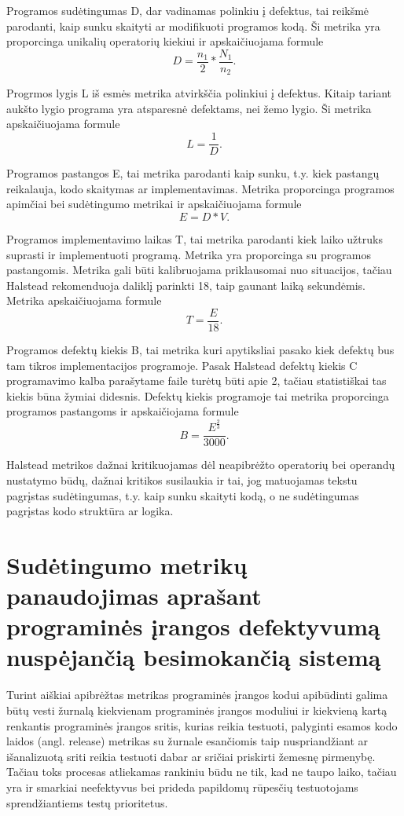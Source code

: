 \documentclass{VUMIFPSbakalaurinis}
\begin{document}
Programos sudėtingumas D, dar vadinamas polinkiu į defektus, tai reikšmė parodanti, kaip sunku skaityti ar modifikuoti programos kodą. Ši metrika yra proporcinga unikalių operatorių kiekiui ir apskaičiuojama formule \[D = \frac{n_1}{2} * \frac{N_1}{n_2}.\]

Progrmos lygis L iš esmės metrika atvirkščia polinkiui į defektus. Kitaip tariant aukšto lygio programa yra atsparesnė defektams, nei žemo lygio. Ši metrika apskaičiuojama formule \[L = \frac{1}{D}.\]

Programos pastangos E, tai metrika parodanti kaip sunku, t.y. kiek pastangų reikalauja, kodo skaitymas ar implementavimas. Metrika proporcinga programos apimčiai bei sudėtingumo metrikai ir apskaičiuojama formule \[E = D * V.\]

Programos implementavimo laikas T, tai metrika parodanti kiek laiko užtruks suprasti ir implementuoti programą. Metrika yra proporcinga su programos pastangomis. Metrika gali būti kalibruojama priklausomai nuo situacijos, tačiau Halstead rekomenduoja daliklį parinkti 18, taip gaunant laiką sekundėmis. Metrika apskaičiuojama formule \[T = \frac{E}{18}.\]

Programos defektų kiekis B, tai metrika kuri apytiksliai pasako kiek defektų bus tam tikros implementacijos programoje. Pasak Halstead defektų kiekis C programavimo kalba parašytame faile turėtų būti apie 2, tačiau statistiškai tas kiekis būna žymiai didesnis. Defektų kiekis programoje tai metrika proporcinga programos pastangoms ir apskaičiojama formule  \[B = \frac{E^\frac{2}{3}}{3000} .\]

Halstead metrikos dažnai kritikuojamas dėl neapibrėžto operatorių bei operandų nustatymo būdų, dažnai kritikos susilaukia ir tai, jog matuojamas tekstu pagrįstas sudėtingumas, t.y. kaip sunku skaityti kodą, o ne sudėtingumas pagrįstas kodo struktūra ar logika.

\section{Sudėtingumo metrikų panaudojimas aprašant programinės įrangos defektyvumą nuspėjančią besimokančią sistemą}

Turint aiškiai apibrėžtas metrikas programinės įrangos kodui apibūdinti galima būtų vesti žurnalą kiekvienam programinės įrangos moduliui ir kiekvieną kartą renkantis programinės įrangos sritis, kurias reikia testuoti, palyginti esamos kodo laidos (angl. release) metrikas su žurnale esančiomis taip nuspriandžiant ar išanalizuotą sriti reikia testuoti dabar ar sričiai priskirti žemesnę pirmenybę. Tačiau toks procesas atliekamas rankiniu būdu ne tik, kad ne taupo laiko, tačiau yra ir smarkiai neefektyvus bei prideda papildomų rūpesčių testuotojams sprendžiantiems testų prioritetus.
\end{document}
